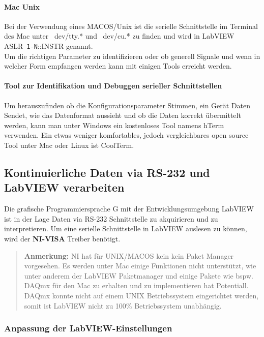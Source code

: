 \paragraph{Mac Unix} Bei der Verwendung eines MACOS/Unix ist die serielle Schnittstelle im Terminal des Mac unter ~dev/tty.* und ~dev/cu.* zu finden und wird in LabVIEW \mbox{ASLR \texttt{1-N}::INSTR} genannt. \\

\noindent Um die richtigen Parameter zu identifizieren oder ob generell Signale und wenn in welcher Form empfangen werden kann mit einigen Tools erreicht werden.

\paragraph{Tool zur Identifikation und Debuggen serieller Schnittstellen} Um herauszufinden ob die Konfigurationsparameter Stimmen, ein Gerät Daten Sendet, wie das Datenformat aussieht und ob die Daten korrekt übermittelt werden, kann man unter Windows ein kostenloses Tool namens hTerm verwenden. Ein etwas weniger komfortables, jedoch vergleichbares open source Tool unter Mac oder Linux ist CoolTerm.\\

\subsection{Kontinuierliche Daten via RS-232 und LabVIEW verarbeiten}

Die grafische Programmiersprache G mit der Entwicklungsumgebung LabVIEW ist in der Lage Daten via RS-232 Schnittstelle zu akquirieren und zu interpretieren. Um eine serielle Schnittstelle in LabVIEW auslesen zu können, wird der \textbf{NI-VISA} Treiber benötigt. 
\vspace{1mm}
\begin{quote}
\footnotesize 
\noindent \textbf{Anmerkung:} NI hat für UNIX/MACOS kein kein Paket Manager vorgesehen. Es werden unter Mac einige Funktionen nicht unterstützt, wie unter anderem der LabVIEW Paketmanager und einige Pakete wie bspw. DAQmx für den Mac zu erhalten und zu implementieren hat \glqq Potentiall\grqq{}. DAQmx konnte nicht auf einem UNIX Betriebssystem eingerichtet werden, somit ist LabVIEW nicht zu 100\% Betriebssystem unabhängig. 
\end{quote}
\vspace{2mm}

\subsubsection{Anpassung der LabVIEW-Einstellungen}
\label{sec:LabVIEW_Einstellungen}


